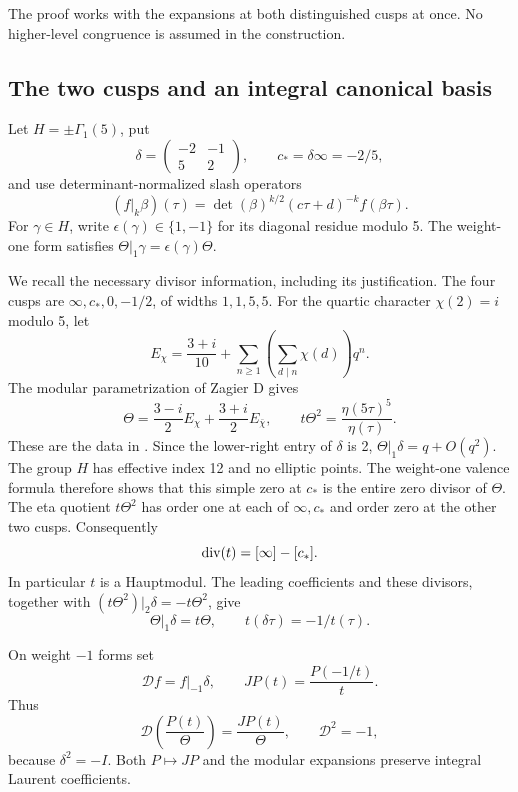 \documentclass[11pt,a4paper]{article}
\theoremstyle{definition}\newtheorem{definition}[theorem]{Definition}
\theoremstyle{remark}\newtheorem{remark}[theorem]{Remark}
\numberwithin{equation}{section}
\begin{document}
The proof works with the expansions at both distinguished cusps at once.
No higher-level congruence is assumed in the construction.

\subsection{The two cusps and an integral canonical basis}

Let \(H=\pm\Gamma_1(5)\), put
\[
 \delta=\begin{pmatrix}-2&-1\\5&2\end{pmatrix},\qquad
 c_*=\delta\infty=-2/5,
\]
and use determinant-normalized slash operators
\[
 (f|_k\beta)(\tau)=
 \det(\beta)^{k/2}(c\tau+d)^{-k}f(\beta\tau).
\]
For \(\gamma\in H\), write \(\epsilon(\gamma)\in\{1,-1\}\)
for its diagonal residue modulo 5.  The weight-one form satisfies
\(\Theta|_1\gamma=\epsilon(\gamma)\Theta\).

We recall the necessary divisor information, including its justification.
The four cusps are \(\infty,c_*,0,-1/2\), of widths \(1,1,5,5\).
For the quartic character \(\chi(2)=i\) modulo 5, let
\[
 E_\chi=\frac{3+i}{10}
       +\sum_{n\ge1}\left(\sum_{d\mid n}\chi(d)\right)q^n.
\]
The modular parametrization of Zagier D gives
\[
 \Theta=\frac{3-i}{2}E_\chi+\frac{3+i}{2}E_{\bar\chi},
 \qquad
 t\Theta^2=\frac{\eta(5\tau)^5}{\eta(\tau)}.
\]
These are the data in \cite[Appendix B, Section 8.8]{Beu26}.
Since the lower-right entry of \(\delta\) is 2,
\(\Theta|_1\delta=q+O(q^2)\).
The group \(H\) has effective index 12 and no elliptic points.
The weight-one valence formula therefore shows that this simple
zero at \(c_*\) is the entire zero divisor of \(\Theta\).
The eta quotient \(t\Theta^2\) has order one at each of
\(\infty,c_*\) and order zero at the other two cusps.  Consequently
\[
 {\rm div}(t)=[\infty]-[c_*].
\]
In particular \(t\) is a Hauptmodul.  The leading coefficients
and these divisors, together with
\((t\Theta^2)|_2\delta=-t\Theta^2\), give
\begin{equation}\label{T:eq:zd-diamond-data}
 \Theta|_1\delta=t\Theta,\qquad
 t(\delta\tau)=-1/t(\tau).
\end{equation}

On weight \(-1\) forms set
\[
 \mathcal{D}f=f|_{-1}\delta,\qquad
 J P(t)=\frac{P(-1/t)}{t}.
\]
Thus
\[
 \mathcal{D}\left(\frac{P(t)}{\Theta}\right)
       =\frac{JP(t)}{\Theta},
 \qquad \mathcal{D}^2=-1,
\]
because \(\delta^2=-I\).
Both \(P\mapsto JP\) and the modular expansions preserve integral
Laurent coefficients.
\end{document}
